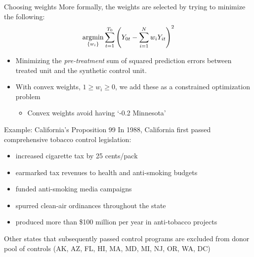 \documentclass[aspectratio=169,t,11pt,table]{beamer}
\begin{document}
\begin{frame}{Choosing weights}
  More formally, the weights are selected by trying to minimize the following:
  $$
    \operatorname*{argmin}_{ \{ w_i \} } \sum_{t=1}^{T_0} \left( Y_{0t} - \sum_{i=1}^N w_i Y_{it} \right)^2
  $$
  \begin{itemize}
    \item Minimizing the \emph{pre-treatment} sum of squared prediction errors between treated unit and the synthetic control unit.
    \item With convex weights, $1 \geq w_i \geq 0$, we add these as a constrained optimization problem
    \begin{itemize}
      \item Convex weights avoid having `-0.2 Minnesota'
    \end{itemize}
  \end{itemize}
\end{frame}


\begin{frame}{Example: California's Proposition 99}
	In 1988, California first passed comprehensive tobacco control legislation:
  \begin{itemize}
		\item increased cigarette tax by 25 cents/pack
		\item earmarked tax revenues to health and anti-smoking budgets
		\item funded anti-smoking media campaigns
		\item spurred clean-air ordinances throughout the state
		\item produced more than \$100 million per year in anti-tobacco projects
  \end{itemize}
	
  \bigskip Other states that subsequently passed control programs are excluded from donor pool of controls (AK, AZ, FL, HI, MA, MD, MI, NJ, OR, WA, DC)
\end{frame}


\end{document}
